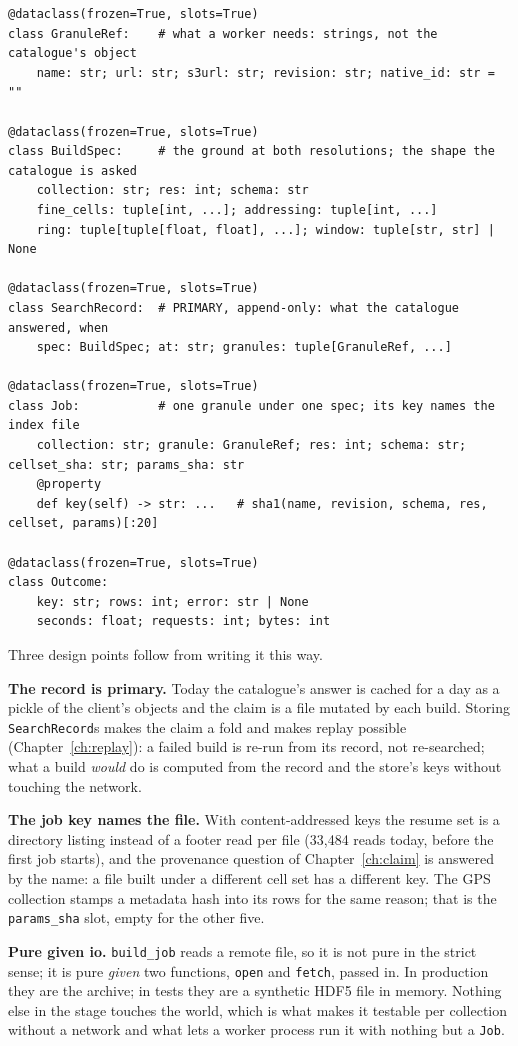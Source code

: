 \documentclass[10pt,a4paper]{article}
\newcommand{\code}[1]{\texttt{#1}}
\begin{document}
\begin{lstlisting}
@dataclass(frozen=True, slots=True)
class GranuleRef:    # what a worker needs: strings, not the catalogue's object
    name: str; url: str; s3url: str; revision: str; native_id: str = ""

@dataclass(frozen=True, slots=True)
class BuildSpec:     # the ground at both resolutions; the shape the catalogue is asked
    collection: str; res: int; schema: str
    fine_cells: tuple[int, ...]; addressing: tuple[int, ...]
    ring: tuple[tuple[float, float], ...]; window: tuple[str, str] | None

@dataclass(frozen=True, slots=True)
class SearchRecord:  # PRIMARY, append-only: what the catalogue answered, when
    spec: BuildSpec; at: str; granules: tuple[GranuleRef, ...]

@dataclass(frozen=True, slots=True)
class Job:           # one granule under one spec; its key names the index file
    collection: str; granule: GranuleRef; res: int; schema: str; cellset_sha: str; params_sha: str
    @property
    def key(self) -> str: ...   # sha1(name, revision, schema, res, cellset, params)[:20]

@dataclass(frozen=True, slots=True)
class Outcome:
    key: str; rows: int; error: str | None
    seconds: float; requests: int; bytes: int
\end{lstlisting}

Three design points follow from writing it this way.

\textbf{The record is primary.} Today the catalogue's answer is cached for a day as a pickle of the client's
objects and the claim is a file mutated by each build. Storing \code{SearchRecord}s makes the claim a fold and
makes replay possible (Chapter~\ref{ch:replay}): a failed build is re-run from its record, not re-searched; what a
build \emph{would} do is computed from the record and the store's keys without touching the network.

\textbf{The job key names the file.} With content-addressed keys the resume set is a directory listing instead of
a footer read per file (33{,}484 reads today, before the first job starts), and the provenance question of
Chapter~\ref{ch:claim} is answered by the name: a file built under a different cell set has a different key. The
GPS collection stamps a metadata hash into its rows for the same reason; that is the \code{params\_sha} slot,
empty for the other five.

\textbf{Pure given io.} \code{build\_job} reads a remote file, so it is not pure in the strict sense; it is pure
\emph{given} two functions, \code{open} and \code{fetch}, passed in. In production they are the archive; in tests
they are a synthetic HDF5 file in memory. Nothing else in the stage touches the world, which is what makes it
testable per collection without a network and what lets a worker process run it with nothing but a \code{Job}.
\end{document}
